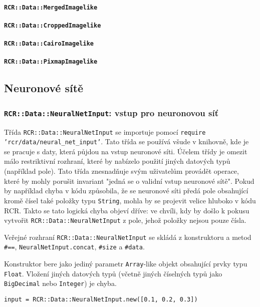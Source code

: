 \documentclass[a4paper]{article}
\begin{document}
\paragraph{\texttt{RCR::Data::MergedImagelike}}
\paragraph{\texttt{RCR::Data::CroppedImagelike}}
\paragraph{\texttt{RCR::Data::CairoImagelike}}
\paragraph{\texttt{RCR::Data::PixmapImagelike}}

\subsection{Neuronové sítě}
\subsubsection{\texttt{RCR::Data::NeuralNetInput}: vstup pro neuronovou síť}
Třída \texttt{RCR::Data::NeuralNetInput} se importuje pomocí \texttt{require
'rcr/data/neural\_net\_input'}. Tato třída se používá všude v knihovně, kde
je se pracuje s daty, která půjdou na vstup neuronové síti. Účelem třídy
je omezit málo restriktivní rozhraní, které by nabízelo použití jiných datových
typů (například pole). Tato třída znesnadňuje svým uživatelům provádět operace,
které by mohly porušit invariant "jedná se o validní vstup neuronové sítě".
Pokud by například chyba v kódu způsobila, že se neuronové síti předá pole
obsahující kromě čísel také položky typu \texttt{String}, mohla by se projevit
velice hluboko v kódu RCR. Takto se tato logická chyba objeví dříve: ve chvíli,
kdy by došlo k pokusu vytvořit \texttt{RCR::Data::NeuralNetInput} z pole,
jehož položky nejsou pouze čísla.

Veřejné rozhraní \texttt{RCR::Data::NeuralNetInput} se skládá z konstruktoru a
metod \texttt{\#==}, \texttt{NeuralNetInput.concat}, \texttt{\#size} a \texttt{\#data}.

Konstruktor bere jako jediný parametr \texttt{Array}-like objekt obsahující
prvky typu \texttt{Float}. Vložení jiných datových typů (včetně jiných číselných
typů jako \texttt{BigDecimal} nebo \texttt{Integer}) je chyba.
\begin{lstlisting}
input = RCR::Data::NeuralNetInput.new([0.1, 0.2, 0.3])
\end{lstlisting}
\end{document}
